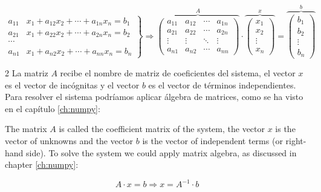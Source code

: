 \begin{equation*}
\left. \begin{aligned}
a_{11}&x_1+a_{12}x_2+\cdots +a_{1n}x_n=b_1\\
a_{21}&x_1+a_{22}x_2+\cdots +a_{2n}x_n=b_2\\
\cdots & \\
a_{n1}&x_1+a_{n2}x_2+\cdots +a_{nn}x_n=b_n
\end{aligned}\right\} \Rightarrow	\overbrace{\begin{pmatrix}
a_{11}& a_{12}& \cdots & a_{1n}\\
a_{21}& a_{22}& \cdots & a_{2n}\\
\vdots & \vdots & \ddots & \vdots\\
a_{n1}& a_{n2}& \cdots & a_{nn}
\end{pmatrix}}^A \cdot \overbrace{\begin{pmatrix}
x_1\\
x_2\\
\vdots \\
x_n
\end{pmatrix}}^x=\overbrace{\begin{pmatrix}
b_1\\
b_2\\
\vdots \\
b_n
\end{pmatrix}}^b
\end{equation*}

\begin{paracol}{2}
La matriz $A$ recibe el nombre de matriz de coeficientes del sistema, el vector $x$ es el vector de incógnitas y el vector $b$ es el vector de términos independientes. Para resolver el sistema podríamos aplicar álgebra de matrices, como se ha visto en el capítulo \ref{ch:numpy}:

\switchcolumn
The matrix $A$ is called the coefficient matrix of the system, the vector $x$ is the vector of unknowns and the vector $b$ is the vector of independent terms (or right-hand side). To solve the system we could apply matrix algebra, as discussed in chapter \ref{ch:numpy}:

\end{paracol}

\begin{equation*}
A\cdot x=b \Rightarrow x=A^{-1}\cdot b
\end{equation*}

